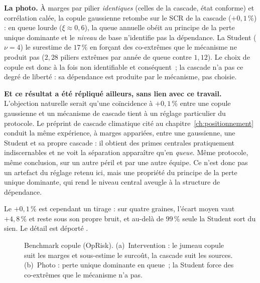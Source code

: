 \textbf{La photo.} À marges par pilier \emph{identiques} (celles de la cascade, état
conforme) et corrélation calée, la copule gaussienne retombe sur le SCR de la cascade
($+0{,}1\,\%$) : en queue lourde ($\xi \approx 0{,}6$), la queue annuelle obéit au principe
de la perte unique dominante et le \emph{niveau} de base n'identifie pas la dépendance. La
Student ($\nu = 4$) le surestime de $17\,\%$ en forçant des co-extrêmes que le mécanisme ne
produit pas ($2{,}28$ piliers extrêmes par année de queue contre $1{,}12$). Le choix de
copule est donc à la fois non identifiable et conséquent~; la cascade n'a pas ce degré de
liberté : sa dépendance est produite par le mécanisme, pas choisie.

\textbf{Et ce résultat a été répliqué ailleurs, sans lien avec ce travail.} L'objection naturelle
serait qu'une coïncidence à $+0{,}1\,\%$ entre une copule gaussienne et un mécanisme de cascade
tient à un réglage particulier du protocole. Le préprint de cascade climatique cité au
chapitre~\ref{ch:positionnement} \citep{ccrn2026} conduit la même expérience, à marges appariées,
entre une gaussienne, une Student et sa propre cascade : il obtient des primes centrales
pratiquement indiscernables et ne voit la séparation apparaître qu'en \emph{queue}. Même
protocole, même conclusion, sur un autre péril et par une autre équipe. Ce n'est donc pas un
artefact du réglage retenu ici, mais une propriété du principe de la perte unique dominante,
qui rend le niveau central aveugle à la structure de dépendance.

Le $+0{,}1\,\%$ est cependant un tirage : sur quatre graines, l'écart moyen vaut $+4{,}8\,\%$
et reste sous son propre bruit, et au-delà de $99\,\%$ seule la Student sort du sien. Le détail
est déporté \matcomp.

\begin{figure}[H]\centering
{}
\caption{Benchmark copule (OpRisk). (a)~Intervention : le jumeau copule suit les marges et
sous-estime le surcoût, la cascade suit les sources. (b)~Photo : perte unique dominante en
queue~; la Student force des co-extrêmes que le mécanisme n'a pas.}
\label{fig:benchmark}
\end{figure}

